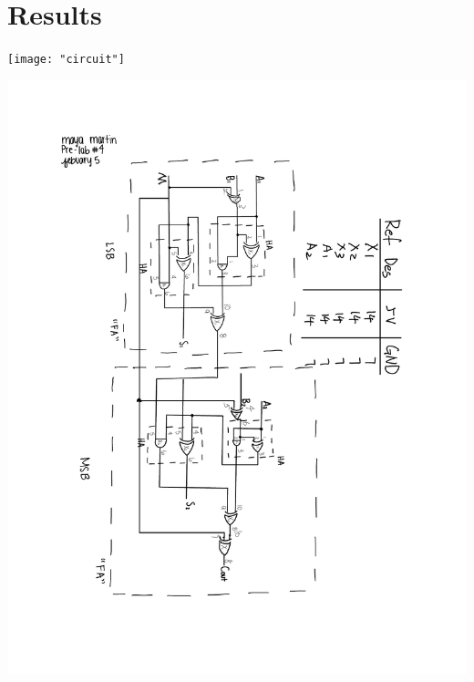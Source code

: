 \documentclass[11pt]{article}
\begin{document}
\section*{Results}


\texttt{[image: "circuit"]}
\label{fig:Circuit picture}



\includegraphics[width=\textwidth]{"schematic"}
\label{fig:Schematic}
\end{document}
